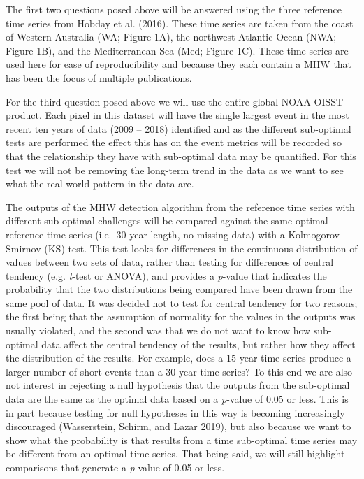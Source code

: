 \documentclass[]{article}
\begin{document}
The first two questions posed above will be answered using the three
reference time series from Hobday et al. (2016). These time series are
taken from the coast of Western Australia (WA; Figure 1A), the northwest
Atlantic Ocean (NWA; Figure 1B), and the Mediterranean Sea (Med; Figure
1C). These time series are used here for ease of reproducibility and
because they each contain a MHW that has been the focus of multiple
publications.

For the third question posed above we will use the entire global NOAA
OISST product. Each pixel in this dataset will have the single largest
event in the most recent ten years of data (2009 -- 2018) identified and
as the different sub-optimal tests are performed the effect this has on
the event metrics will be recorded so that the relationship they have
with sub-optimal data may be quantified. For this test we will not be
removing the long-term trend in the data as we want to see what the
real-world pattern in the data are.

The outputs of the MHW detection algorithm from the reference time
series with different sub-optimal challenges will be compared against
the same optimal reference time series (i.e.~30 year length, no missing
data) with a Kolmogorov-Smirnov (KS) test. This test looks for
differences in the continuous distribution of values between two sets of
data, rather than testing for differences of central tendency (e.g.
\emph{t}-test or ANOVA), and provides a \emph{p}-value that indicates
the probability that the two distributions being compared have been
drawn from the same pool of data. It was decided not to test for central
tendency for two reasons; the first being that the assumption of
normality for the values in the outputs was usually violated, and the
second was that we do not want to know how sub-optimal data affect the
central tendency of the results, but rather how they affect the
distribution of the results. For example, does a 15 year time series
produce a larger number of short events than a 30 year time series? To
this end we are also not interest in rejecting a null hypothesis that
the outputs from the sub-optimal data are the same as the optimal data
based on a \emph{p}-value of 0.05 or less. This is in part because
testing for null hypotheses in this way is becoming increasingly
discouraged (Wasserstein, Schirm, and Lazar 2019), but also because we
want to show what the probability is that results from a time
sub-optimal time series may be different from an optimal time series.
That being said, we will still highlight comparisons that generate a
\emph{p}-value of 0.05 or less.
\end{document}

